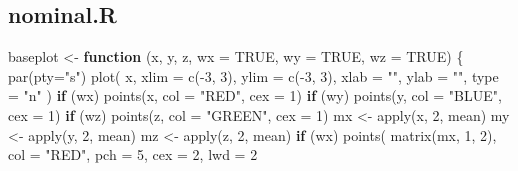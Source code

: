 \documentclass[
  12pt,
  letterpaper,
  DIV=11,
  numbers=noendperiod]{scrreprt}
\newenvironment{Shaded}{\begin{snugshade}}{\end{snugshade}}
\newcommand{\AttributeTok}[1]{\textcolor[rgb]{0.40,0.45,0.13}{#1}}
\newcommand{\ConstantTok}[1]{\textcolor[rgb]{0.56,0.35,0.01}{#1}}
\newcommand{\ControlFlowTok}[1]{\textcolor[rgb]{0.00,0.23,0.31}{\textbf{#1}}}
\newcommand{\DecValTok}[1]{\textcolor[rgb]{0.68,0.00,0.00}{#1}}
\newcommand{\FunctionTok}[1]{\textcolor[rgb]{0.28,0.35,0.67}{#1}}
\newcommand{\NormalTok}[1]{\textcolor[rgb]{0.00,0.23,0.31}{#1}}
\newcommand{\OtherTok}[1]{\textcolor[rgb]{0.00,0.23,0.31}{#1}}
\newcommand{\SpecialCharTok}[1]{\textcolor[rgb]{0.37,0.37,0.37}{#1}}
\newcommand{\StringTok}[1]{\textcolor[rgb]{0.13,0.47,0.30}{#1}}
\theoremstyle{remark}
\begin{document}
\subsection*{nominal.R}\label{apcodenominal}

\begin{Shaded}
\begin{Highlighting}[]
\NormalTok{baseplot }\OtherTok{\textless{}{-}} \ControlFlowTok{function}\NormalTok{ (x,}
\NormalTok{                      y,}
\NormalTok{                      z,}
                      \AttributeTok{wx =} \ConstantTok{TRUE}\NormalTok{,}
                      \AttributeTok{wy =} \ConstantTok{TRUE}\NormalTok{,}
                      \AttributeTok{wz =} \ConstantTok{TRUE}\NormalTok{) \{}
  \FunctionTok{par}\NormalTok{(}\AttributeTok{pty=}\StringTok{"s"}\NormalTok{)}
  \FunctionTok{plot}\NormalTok{(}
\NormalTok{    x,}
    \AttributeTok{xlim =} \FunctionTok{c}\NormalTok{(}\SpecialCharTok{{-}}\DecValTok{3}\NormalTok{, }\DecValTok{3}\NormalTok{),}
    \AttributeTok{ylim =} \FunctionTok{c}\NormalTok{(}\SpecialCharTok{{-}}\DecValTok{3}\NormalTok{, }\DecValTok{3}\NormalTok{),}
    \AttributeTok{xlab =} \StringTok{""}\NormalTok{,}
    \AttributeTok{ylab =} \StringTok{""}\NormalTok{,}
    \AttributeTok{type  =} \StringTok{"n"}
\NormalTok{  )}
  \ControlFlowTok{if}\NormalTok{ (wx)}
    \FunctionTok{points}\NormalTok{(x, }\AttributeTok{col =} \StringTok{"RED"}\NormalTok{, }\AttributeTok{cex =} \DecValTok{1}\NormalTok{)}
  \ControlFlowTok{if}\NormalTok{ (wy)}
    \FunctionTok{points}\NormalTok{(y, }\AttributeTok{col =} \StringTok{"BLUE"}\NormalTok{, }\AttributeTok{cex =} \DecValTok{1}\NormalTok{)}
  \ControlFlowTok{if}\NormalTok{ (wz)}
    \FunctionTok{points}\NormalTok{(z, }\AttributeTok{col =} \StringTok{"GREEN"}\NormalTok{, }\AttributeTok{cex =} \DecValTok{1}\NormalTok{)}
\NormalTok{  mx }\OtherTok{\textless{}{-}} \FunctionTok{apply}\NormalTok{(x, }\DecValTok{2}\NormalTok{, mean)}
\NormalTok{  my }\OtherTok{\textless{}{-}} \FunctionTok{apply}\NormalTok{(y, }\DecValTok{2}\NormalTok{, mean)}
\NormalTok{  mz }\OtherTok{\textless{}{-}} \FunctionTok{apply}\NormalTok{(z, }\DecValTok{2}\NormalTok{, mean)}
  \ControlFlowTok{if}\NormalTok{ (wx)}
    \FunctionTok{points}\NormalTok{(}
      \FunctionTok{matrix}\NormalTok{(mx, }\DecValTok{1}\NormalTok{, }\DecValTok{2}\NormalTok{),}
      \AttributeTok{col =} \StringTok{"RED"}\NormalTok{,}
      \AttributeTok{pch =} \DecValTok{5}\NormalTok{,}
      \AttributeTok{cex =} \DecValTok{2}\NormalTok{,}
      \AttributeTok{lwd =} \DecValTok{2}

\end{Highlighting}
\end{Shaded}
\end{document}
